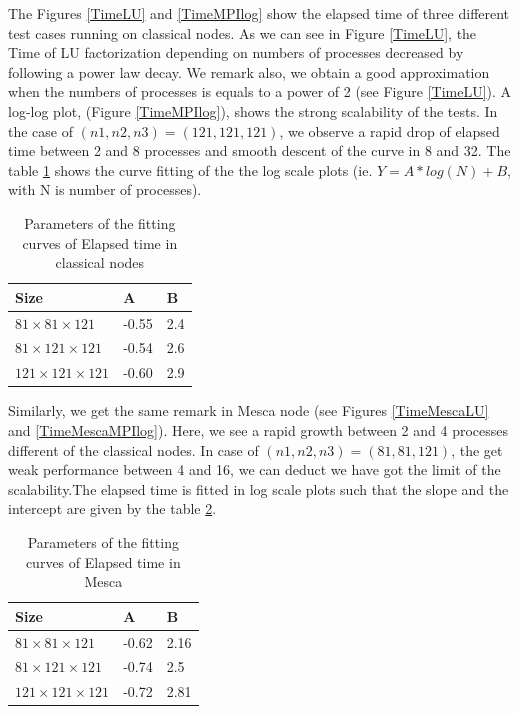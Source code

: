 The Figures \ref{TimeLU} and \ref{TimeMPIlog} show the elapsed time of three different test cases running on classical nodes. As we can see in Figure \ref{TimeLU}, the Time of LU factorization depending on numbers of processes decreased by following a power law decay. We remark also, we obtain a good approximation when the numbers of processes is equals to a power of 2 (see Figure \ref{TimeLU}). A log-log plot, (Figure \ref{TimeMPIlog}), shows the strong scalability of the tests. In the case of $(n1,n2,n3)=(121,121,121)$, we observe a rapid drop of elapsed time between 2 and 8 processes and smooth descent of the curve in 8 and 32. The table \ref{fitting} shows the curve fitting of the the log scale plots (ie. $ Y= A*log(N)+B $, with N is number of processes).

\begin{table}[!h]
\centering
\begin{tabular}{l|l|l}
Size & A & B  \\
 \hline
$81 \times 81 \times 121$ & -0.55 & 2.4	 \\
 $81 \times 121 \times 121$ & -0.54 & 2.6 \\
$ 121 \times 121 \times 121$ &  -0.60 & 2.9 

\end{tabular}
\caption{Parameters of the fitting curves of Elapsed time in classical nodes}
\label{fitting}
\end{table}

Similarly, we get the same remark in Mesca node (see Figures \ref{TimeMescaLU} and \ref{TimeMescaMPIlog}). Here, we see a rapid growth between 2 and 4 processes different of the classical nodes. In case of $(n1,n2,n3)=(81,81,121)$, the get weak performance between 4 and 16, we can deduct we have got the limit of the scalability.The elapsed time is fitted in log scale plots such that the slope and the intercept are given by the table \ref{fittingMesca}. 

\begin{table}[!h]
\centering
\begin{tabular}{l|l|l}
Size & A & B  \\
 \hline
 $81 \times 81 \times 121$ & -0.62 & 2.16	\\
$81 \times 121 \times 121$ & -0.74 & 2.5 \\
$121 \times 121 \times 121$ &  -0.72 & 2.81

\end{tabular}
\caption{Parameters of the fitting curves of Elapsed time in Mesca}
\label{fittingMesca}
\end{table}

